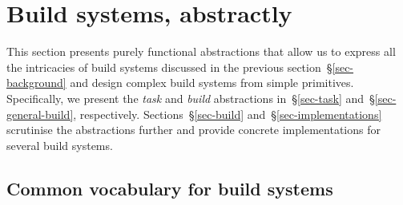 \section{Build systems, abstractly}\label{sec-abstractions}

This section presents purely functional abstractions that allow us to express
all the intricacies of build systems discussed in the previous
section~\S\ref{sec-background} and design complex build systems from simple
primitives. Specifically, we present the \emph{task} and \emph{build}
abstractions in~\S\ref{sec-task} and~\S\ref{sec-general-build}, respectively.
Sections~\S\ref{sec-build} and~\S\ref{sec-implementations} scrutinise the
abstractions further and provide concrete implementations for several build
systems.

\subsection{Common vocabulary for build systems}\label{sec-vocabulary}

